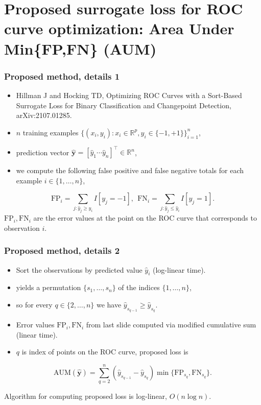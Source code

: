 \documentclass[t]{beamer}
\begin{document}
\section{Proposed surrogate loss for ROC curve optimization: Area Under Min\{FP,FN\} (AUM)} 

\begin{frame}
  \frametitle{Proposed method, details 1}
  \begin{itemize}
  \item Hillman J and Hocking TD, Optimizing ROC Curves with a
    Sort-Based Surrogate Loss for Binary Classification and
    Changepoint Detection, arXiv:2107.01285.
  \item  $n$ training examples $\{(x_i, y_i): x_i \in \mathbb{R}^p, y_i\in \{-1,+1\} \}_{i=1}^n$,
  \item prediction vector $\mathbf{\hat y}=[\hat y_1 \cdots \hat y_n]^\intercal\in\mathbb R^n$,
\item we compute the following false positive and false negative totals for each example $i\in\{1,\dots,n\}$,
  \end{itemize}
\begin{equation}
  \text{FP}_i = \sum_{j: \hat y_j \geq \hat y_i} I[y_j = -1], \ \ 
  \text{FN}_i = \sum_{j: \hat y_j \leq \hat y_i} I[y_j = 1].\label{eq:fp-fn-under}
\end{equation}
$\text{FP}_i, \text{FN}_i$ are the error values at
the point on the ROC curve that corresponds to observation $i$.
\end{frame}

\begin{frame}
  \frametitle{Proposed method, details 2}
  \begin{itemize}
  \item Sort the observations by predicted value $\hat y_i$ (log-linear time).
  \item yields a permutation $\{s_1,\dots, s_n\}$ of the indices $\{1,\dots,n\}$,
  \item so for every $q\in\{2,\dots,n\}$ we have
    $\hat y_{s_{q-1}} \geq \hat y_{s_q}$.
  \item Error values $\text{FP}_i,\text{FN}_i$ from last slide
    computed via modified cumulative sum (linear time).
  \item $q$ is index of points on the ROC curve, proposed loss is
  \end{itemize}
\begin{equation}
    \text{AUM}(\mathbf{\hat y}) =
    \sum_{q=2}^n 
    (\hat y_{s_{q-1}} -\hat y_{s_q}) 
    \min\{
    \text{FP}_{s_q}, 
    \text{FN}_{s_q}\label{eq:min_below}
    \}. 
  \end{equation}

  Algorithm for computing proposed loss is log-linear, $O(n\log n)$.


\end{frame}
 
\end{document}
